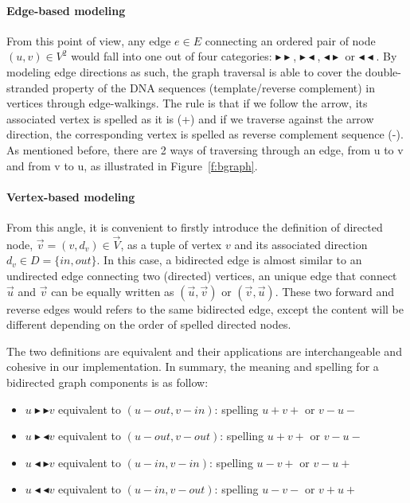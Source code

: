 \paragraph{Edge-based modeling} From this point of view, any edge $e \in E$ connecting an ordered pair of node $(u,v) \in V^2$ would fall into one out of four categories: $\blacktriangleright\blacktriangleright$, $\blacktriangleright\blacktriangleleft$, $\blacktriangleleft\blacktriangleright$ or $\blacktriangleleft\blacktriangleleft$. By modeling edge directions as such, the graph traversal is able to cover the double-stranded property of the DNA sequences (template/reverse complement) in vertices through edge-walkings. 
The rule is that if we follow the arrow, its associated vertex is spelled as it is (+) and if we traverse against the arrow direction, the corresponding vertex is spelled as reverse complement sequence (-). As mentioned before, there are 2 ways of traversing through an edge, \EG from u to v and from v to u, as illustrated in Figure~\ref{f:bgraph}.
\paragraph{Vertex-based modeling} From this angle, it is convenient to firstly introduce the definition of directed node,  $\overrightarrow{v}=(v,d_v) \in \overrightarrow{V}$, as a tuple of vertex $v$ and its associated direction $d_v \in D=\{in,out\}$.
In this case, a bidirected edge is almost similar to an undirected edge connecting two (directed) vertices, \EG an unique edge that connect $\overrightarrow{u}$ and $\overrightarrow{v}$ can be equally written as $(\overrightarrow{u}, \overrightarrow{v})$ or $(\overrightarrow{v}, \overrightarrow{u})$. These two forward and reverse edges would refers to the same bidirected edge, except the content will be different depending on the order of spelled directed nodes.

The two definitions are equivalent and their applications are interchangeable and cohesive in our implementation. In summary, the meaning and spelling for a bidirected graph components is as follow:
\begin{itemize}
\item $u\blacktriangleright\blacktriangleright v$ equivalent to $(u-out, v-in)$: spelling $u+v+$ or $v-u-$
\item $u\blacktriangleright\blacktriangleleft v$ equivalent to $(u-out, v-out)$: spelling $u+v+$ or $v-u-$
\item $u\blacktriangleleft\blacktriangleright v$ equivalent to $(u-in, v-in)$: spelling $u-v+$ or $v-u+$
\item $u\blacktriangleleft\blacktriangleleft v$ equivalent to $(u-in, v-out)$: spelling $u-v-$ or $v+u+$
\end{itemize}

